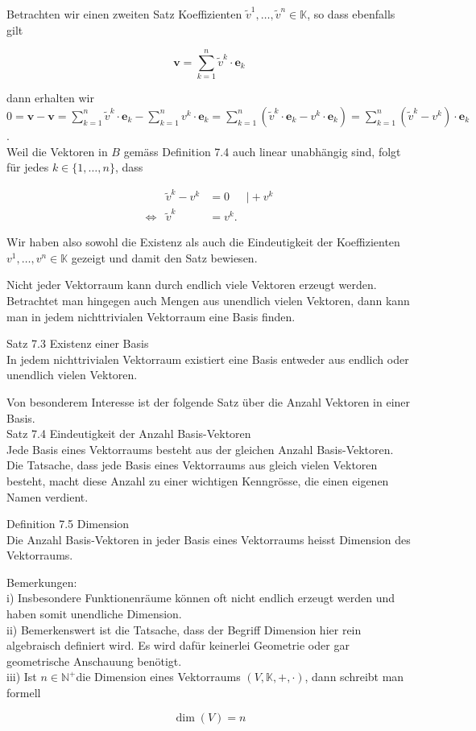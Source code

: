 \documentclass[10pt]{article}
\begin{document}
Betrachten wir einen zweiten Satz Koeffizienten $\tilde{v}^{1}, \ldots, \tilde{v}^{n} \in \mathbb{K}$, so dass ebenfalls gilt


\begin{equation*}
\mathbf{v}=\sum_{k=1}^{n} \tilde{v}^{k} \cdot \mathbf{e}_{k} \tag{7.18}
\end{equation*}


dann erhalten wir\\
$0=\mathbf{v}-\mathbf{v}=\sum_{k=1}^{n} \tilde{v}^{k} \cdot \mathbf{e}_{k}-\sum_{k=1}^{n} v^{k} \cdot \mathbf{e}_{k}=\sum_{k=1}^{n}\left(\tilde{v}^{k} \cdot \mathbf{e}_{k}-v^{k} \cdot \mathbf{e}_{k}\right)=\sum_{k=1}^{n}\left(\tilde{v}^{k}-v^{k}\right) \cdot \mathbf{e}_{k}$.\\
Weil die Vektoren in $B$ gemäss Definition 7.4 auch linear unabhängig sind, folgt für jedes $k \in\{1, \ldots, n\}$, dass


\begin{align*}
& \tilde{v}^{k}-v^{k} & =0 & \mid+v^{k}  \tag{7.20}\\
\Leftrightarrow & \tilde{v}^{k} & =v^{k} . & \tag{7.21}
\end{align*}


Wir haben also sowohl die Existenz als auch die Eindeutigkeit der Koeffizienten $v^{1}, \ldots, v^{n} \in \mathbb{K}$ gezeigt und damit den Satz bewiesen.

Nicht jeder Vektorraum kann durch endlich viele Vektoren erzeugt werden. Betrachtet man hingegen auch Mengen aus unendlich vielen Vektoren, dann kann man in jedem nichttrivialen Vektorraum eine Basis finden.

Satz 7.3 Existenz einer Basis\\
In jedem nichttrivialen Vektorraum existiert eine Basis entweder aus endlich oder unendlich vielen Vektoren.

Von besonderem Interesse ist der folgende Satz über die Anzahl Vektoren in einer Basis.\\
Satz 7.4 Eindeutigkeit der Anzahl Basis-Vektoren\\
Jede Basis eines Vektorraums besteht aus der gleichen Anzahl Basis-Vektoren.\\
Die Tatsache, dass jede Basis eines Vektorraums aus gleich vielen Vektoren besteht, macht diese Anzahl zu einer wichtigen Kenngrösse, die einen eigenen Namen verdient.

Definition 7.5 Dimension\\
Die Anzahl Basis-Vektoren in jeder Basis eines Vektorraums heisst Dimension des Vektorraums.

Bemerkungen:\\
i) Insbesondere Funktionenräume können oft nicht endlich erzeugt werden und haben somit unendliche Dimension.\\
ii) Bemerkenswert ist die Tatsache, dass der Begriff Dimension hier rein algebraisch definiert wird. Es wird dafür keinerlei Geometrie oder gar geometrische Anschauung benötigt.\\
iii) Ist $n \in \mathbb{N}^{+}$die Dimension eines Vektorraums $(V, \mathbb{K},+, \cdot)$, dann schreibt man formell


\begin{equation*}
\operatorname{dim}(V)=n \tag{7.22}
\end{equation*}
\end{document}
